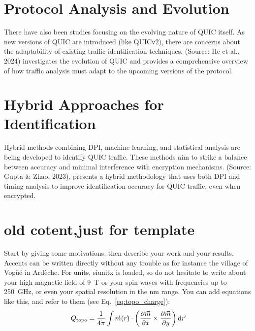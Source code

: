 \documentclass[a4paper, 10pt]{article}
\begin{document}
\begin{CJK}{UTF8}{gbsn}
	\section{Protocol Analysis and Evolution}
	There have also been studies focusing on the evolving nature of QUIC itself. As new versions of QUIC are introduced (like QUICv2), there are concerns about the adaptability of existing traffic identification techniques.
	(Source: He et al., 2024) investigates the evolution of QUIC and provides a comprehensive overview of how traffic analysis must adapt to the upcoming versions of the protocol.
	
	\section{Hybrid Approaches for Identification}
	Hybrid methods combining DPI, machine learning, and statistical analysis are being developed to identify QUIC traffic. These methods aim to strike a balance between accuracy and minimal interference with encryption mechanisms.
	(Source: Gupta \& Zhao, 2023), presents a hybrid methodology that uses both DPI and timing analysis to improve identification accuracy for QUIC traffic, even when encrypted.
	
	\section{old cotent,just for template} 	
	Start by giving some motivations, then describe your work and your results. Accents can be written directly without any trouble as for instance the village of Vogüé in Ardèche. For units, siunitx is loaded, so do not hesitate to write about your high magnetic field of \SI{9}{\tesla} or your spin waves with frequencies up to \SI{250}{\GHz}, or even your spatial resolution in the \si{\nano\meter} range. You can add equations like this, and refer to them (see Eq.~\ref{eq:topo_charge}):
	\begin{equation}
		\label{eq:topo_charge}
		Q_\text{topo} = \frac{1}{4\pi} \int \vec{m}(\vec{r}) \cdot \left (\pdv{\vec{m}}{x} \times \pdv{\vec{m}}{y} \right) \dd{\vec{r}}
	\end{equation}
	

\end{CJK}
\end{document}
